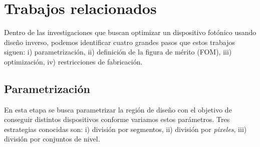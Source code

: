 \chapter{Trabajos relacionados}

Dentro de las investigaciones que buscan optimizar un dispositivo fotónico usando diseño inverso, podemos identificar cuatro grandes pasos que 
estos trabajos siguen: i) parametrización, ii) definición de la figura de mérito (FOM), iii) optimización, iv) restricciones de fabricación.

\section{Parametrización}

En esta etapa se busca parametrizar la región de diseño con el objetivo de conseguir distintos dispositivos conforme variamos estos parámetros.
Tres estrategias conocidas son: i) división por segmentos, ii) división por \emph{pixeles}, iii) división por conjuntos de nivel.

